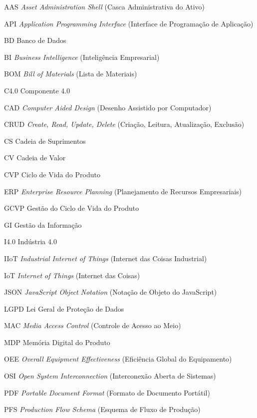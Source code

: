 \begin{siglas}
	\item[AAS] \textit{Asset Administration Shell} (Casca Administrativa do Ativo)
	\item[API] \textit{Application Programming Interface} (Interface de Programação de Aplicação)
	\item[BD] Banco de Dados
	\item[BI] \textit{Business Intelligence} (Inteligência Empresarial)
	\item[BOM] \textit{Bill of Materials} (Lista de Materiais)
	\item[C4.0] Componente 4.0
	\item[CAD] \textit{Computer Aided Design} (Desenho Assistido por Computador)
	\item[CRUD] \textit{Create, Read, Update, Delete} (Criação, Leitura, Atualização, Exclusão)
	\item[CS] Cadeia de Suprimentos
	\item[CV] Cadeia de Valor
	\item[CVP] Ciclo de Vida do Produto
	\item[ERP] \textit{Enterprise Resource Planning} (Planejamento de Recursos Empresariais)
	\item[GCVP] Gestão do Ciclo de Vida do Produto
	\item[GI] Gestão da Informação
	\item[I4.0] Indústria 4.0
	\item[IIoT] \textit{Industrial Internet of Things} (Internet das Coisas Industrial)
	\item[IoT] \textit{Internet of Things} (Internet das Coisas)
	\item[JSON] \textit{JavaScript Object Notation} (Notação de Objeto do JavaScript)
	\item[LGPD] Lei Geral de Proteção de Dados
	\item[MAC] \textit{Media Access Control} (Controle de Acesso ao Meio)
	\item[MDP] Memória Digital do Produto
	\item[OEE] \textit{Overall Equipment Effectiveness} (Eficiência Global do Equipamento)
	\item[OSI] \textit{Open System Interconnection} (Interconexão Aberta de Sistemas)
	\item[PDF] \textit{Portable Document Format} (Formato de Documento Portátil)
	\item[PFS] \textit{Production Flow Schema} (Esquema de Fluxo de Produção)

\end{siglas}
